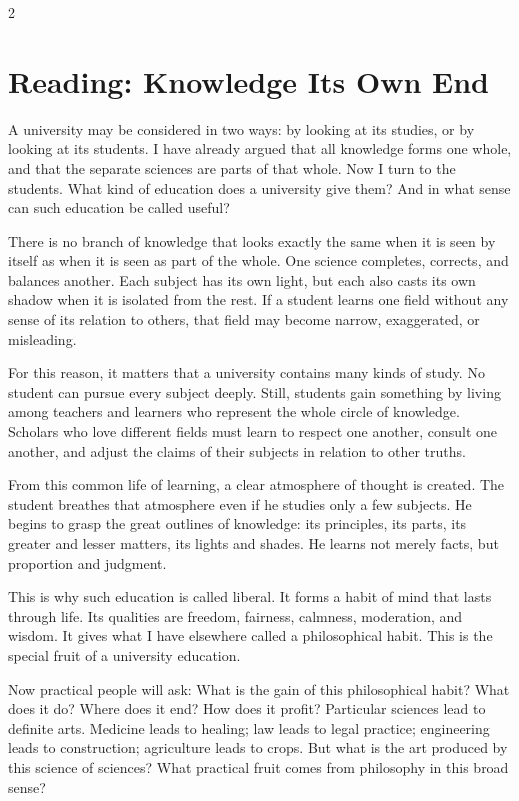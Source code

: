 \documentclass[12pt]{article}
\begin{document}
\begin{multicols}{2}
\section*{Reading: Knowledge Its Own End}

A university may be considered in two ways: by looking at its studies, or by looking at its students. I have already argued that all knowledge forms one whole, and that the separate sciences are parts of that whole. Now I turn to the students. What kind of education does a university give them? And in what sense can such education be called useful?

There is no branch of knowledge that looks exactly the same when it is seen by itself as when it is seen as part of the whole. One science completes, corrects, and balances another. Each subject has its own light, but each also casts its own shadow when it is isolated from the rest. If a student learns one field without any sense of its relation to others, that field may become narrow, exaggerated, or misleading.

For this reason, it matters that a university contains many kinds of study. No student can pursue every subject deeply. Still, students gain something by living among teachers and learners who represent the whole circle of knowledge. Scholars who love different fields must learn to respect one another, consult one another, and adjust the claims of their subjects in relation to other truths.

From this common life of learning, a clear atmosphere of thought is created. The student breathes that atmosphere even if he studies only a few subjects. He begins to grasp the great outlines of knowledge: its principles, its parts, its greater and lesser matters, its lights and shades. He learns not merely facts, but proportion and judgment.

This is why such education is called liberal. It forms a habit of mind that lasts through life. Its qualities are freedom, fairness, calmness, moderation, and wisdom. It gives what I have elsewhere called a philosophical habit. This is the special fruit of a university education.

Now practical people will ask: What is the gain of this philosophical habit? What does it do? Where does it end? How does it profit? Particular sciences lead to definite arts. Medicine leads to healing; law leads to legal practice; engineering leads to construction; agriculture leads to crops. But what is the art produced by this science of sciences? What practical fruit comes from philosophy in this broad sense?


\end{multicols}
\end{document}
